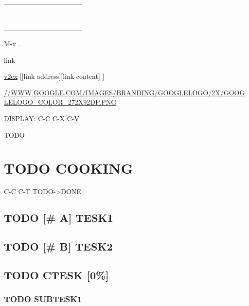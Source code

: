 \documentclass[11pt]{article}
\begin{document}
\begin{center}
\begin{tabular}{|l|l|l|l|l|l|l|l|l|l|}
\hline
 & & & & & & & & & \\
\hline
 & & & & & & & & & \\
\hline
 & & & & & & & & & \\
\hline
 & & & & & & & & & \\
\hline
 & & & & & & & & & \\
\hline
 & & & & & & & & & \\
\hline
 & & & & & & & & & \\
\hline
 & & & & & & & & & \\
\hline
 & & & & & & & & & \\
\hline
 & & & & & & & & & \\
\hline
\end{tabular}
\end{center}

M-x .

link

\href{https://www.v2ex.com}{v2ex}
[[link address][link content] ]

\url{//WWW.GOOGLE.COM/IMAGES/BRANDING/GOOGLELOGO/2X/GOOGLELOGO_COLOR_272X92DP.PNG}

DISPLAY: C-C C-X C-V


TODO

\section{{\bfseries\sffamily TODO} COOKING}
\label{sec-2}
C-C C-T TODO->DONE


\subsection{{\bfseries\sffamily TODO} [\# A] TESK1}
\label{sec-2-1}
\subsection{{\bfseries\sffamily TODO} [\# B] TESK2}
\label{sec-2-2}
\subsection{{\bfseries\sffamily TODO} CTESK [0\%]}
\label{sec-2-3}
\subsubsection{{\bfseries\sffamily TODO} SUBTESK1}
\label{sec-2-3-1}
\end{document}
